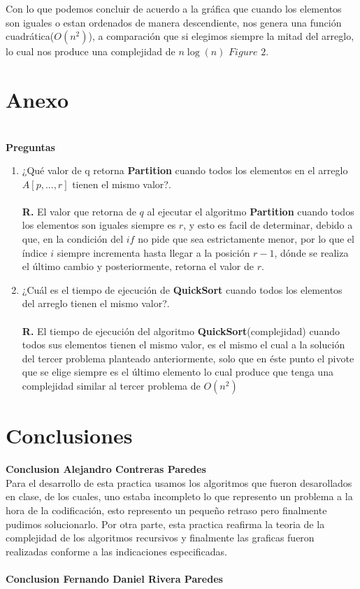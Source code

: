 \documentclass[12pt,twoside]{article}
\begin{document}
Con lo que podemos concluir de acuerdo a la gráfica que cuando los elementos son iguales o estan ordenados de manera descendiente, nos genera una
función cuadrática($O(n^2)$), a comparación que si elegimos siempre la mitad del arreglo, lo cual nos produce una complejidad de $n \log(n)$ $Figure$ $2$.
\newpage

\section{Anexo} 
\text{}\\ 
\textbf{Preguntas}
\begin{enumerate}
  \item ¿Qué valor de q retorna \textbf{Partition} cuando todos los elementos en el arreglo $A[p, ..., r]$ tienen el mismo valor?.\\\\
    \textbf{R.} El valor que retorna de $q$ al ejecutar el algoritmo \textbf{Partition} cuando todos los elementos son iguales siempre es
    $r$, y esto es facil de determinar, debido a que, en la condición del $if$ no pide que sea estrictamente menor, por lo que el índice
    $i$ siempre incrementa hasta llegar a la posición $r - 1$, dónde se realiza el último cambio y posteriormente, retorna el valor de $r$. 
  \item ¿Cuál es el tiempo de ejecución de \textbf{QuickSort} cuando todos los elementos del arreglo tienen el mismo valor?.\\\\
  \textbf{R.} El tiempo de ejecución del algoritmo \textbf{QuickSort}(complejidad) cuando todos sus elementos tienen el mismo valor, es el mismo
  el cual a la solución del tercer problema planteado anteriormente, solo que en éste punto el pivote que se elige siempre es el último elemento
  lo cual produce que tenga una complejidad similar al tercer problema de $O(n^2)$ 
\end{enumerate}

\newpage
\section{Conclusiones}
\textbf{Conclusion Alejandro Contreras Paredes}\\
Para el desarrollo de esta practica usamos los algoritmos que fueron desarollados en clase, de los cuales, uno estaba incompleto
lo que represento un problema a la hora de la codificación, esto represento un pequeño retraso pero finalmente pudimos solucionarlo. Por otra
parte, esta practica reafirma la teoria de la complejidad de los algoritmos recursivos y finalmente las graficas fueron realizadas conforme a las indicaciones
especificadas.\\\\
\textbf{Conclusion Fernando Daniel Rivera Paredes}\\
\end{document}
